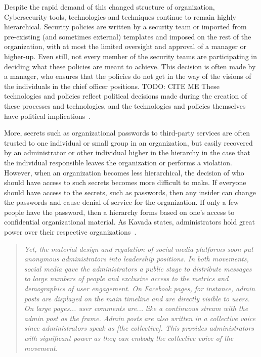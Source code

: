 Despite the rapid demand of this changed structure of organization, 
Cybersecurity tools, technologies and techniques continue to remain highly 
hierarchical. Security policies are written by a security team or imported from
pre-existing (and sometimes external) templates and imposed on the rest of the
organization, with at most the limited oversight and approval of a manager or
higher-up. Even still, not every member of the security teams are participating
in deciding what these policies are meant to achieve. This decision is often
made by a manager, who ensures that the policies do not get in the way of the
visions of the individuals in the chief officer positions. {\color{red}TODO: CITE ME} These technologies
and policies reflect political decisions made during the creation of these
processes and technologies, and the technologies and policies themselves have
political implications~\cite{winner1980artifacts}.

More, secrets such as organizational passwords to third-party services are often
trusted to one individual or small group in an organization, but easily
recovered by an administrator or other individual higher in the hierarchy in the
case that the individual responsible leaves the organization or performs a
violation. However, when an organization becomes less hierarchical, the decision
of who should have access to such secrets becomes more difficult to make. If
everyone should have access to the secrets, such as passwords, then any insider
can change the passwords and cause denial of service for the organization. If
only a few people have the password, then a hierarchy forms based on one's
access to confidential organizational material. As Kavada states, administrators
hold great power over their respective
organizations~\cite{kavada2020counterpublics}.

\begin{quotation}
\textit{Yet, the material design and regulation of social media platforms soon
put anonymous administrators into leadership positions. In both movements,
social media gave the administrators a public stage to distribute messages to
large numbers of people and exclusive access to the metrics and demographics of
user engagement. On Facebook pages, for instance, admin posts are displayed on
the main timeline and are directly visible to users. On large pages... user
comments are... like a continuous stream with the admin post as the frame. Admin
posts are also written in a collective voice since administrators speak as [the
collective]. This provides administrators with significant power as they can
embody the collective voice of the movement.}
\end{quotation}

